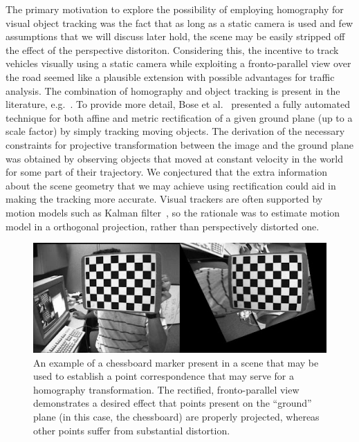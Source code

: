 The primary motivation to explore the possibility of employing homography for visual object tracking was the fact that as long as a static camera is used and few assumptions that we will discuss later hold, the scene may be easily stripped off the effect of the perspective distoriton. Considering this, the incentive to track vehicles visually using a static camera while exploiting a fronto-parallel view over the road seemed like a plausible extension with possible advantages for traffic analysis. The combination of homography and object tracking is present in the literature, e.g.~\cite{Bose04groundplane, Zhang2012, Mei2009}. To provide more detail, Bose et al.~\cite{Bose04groundplane} presented a fully automated technique for both affine and metric rectification of a given ground plane (up to a scale factor) by simply tracking moving objects. The derivation of the necessary constraints for projective transformation between the image and the ground plane was obtained by observing objects that moved at constant velocity in the world for some part of their trajectory. We conjectured that the extra information about the scene geometry that we may achieve using rectification could aid in making the tracking more accurate. Visual trackers are often supported by motion models such as Kalman filter~\cite{Kalman1960}, so the rationale was to estimate motion model in a orthogonal projection, rather than perspectively distorted one.

\begin{figure}[t]
    \centerline{\includegraphics[width=\linewidth]{figures/methodology/chessboard_marker.jpg}}
    \caption[Chessboard marker]{An example of a chessboard marker present in a scene that may be used to establish a point correspondence that may serve for a homography transformation. The rectified, fronto-parallel view demonstrates a desired effect that points present on the ``ground'' plane (in this case, the chessboard) are properly projected, whereas other points suffer from substantial distortion.}
    \label{fig:ChessboardMarker}
\end{figure}

